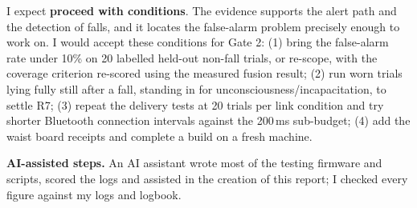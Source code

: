 \documentclass[conference]{IEEEtran}
\begin{document}
I expect \textbf{proceed with conditions}. The evidence supports the alert path and the detection of falls, and it locates the false-alarm problem precisely enough to work on. I would accept these conditions for Gate 2: (1) bring the false-alarm rate under 10\% on 20 labelled held-out non-fall trials, or re-scope, with the coverage criterion re-scored using the measured fusion result; (2) run worn trials lying fully still after a fall, standing in for unconsciousness/incapacitation, to settle R7; (3) repeat the delivery tests at 20 trials per link condition and try shorter Bluetooth connection intervals against the 200\,ms sub-budget; (4) add the waist board receipts and complete a build on a fresh machine.

\textbf{AI-assisted steps.} An AI assistant wrote most of the testing firmware and scripts, scored the logs and assisted in the creation of this report; I checked every figure against my logs and logbook.
\end{document}
